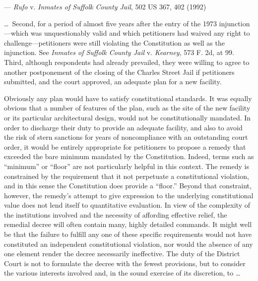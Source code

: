 \setupleglipsum
{ --- \textit{Rufo} v. \textit{Inmates of Suffolk County Jail}, 502 US 367, 402 (1992)}
{
\ldots\ 
Second, for a period of almost five
years after the entry of the 1973 injunction—which was unquestionably
valid and which petitioners had waived any
right to challenge—petitioners were still violating the Constitution
as well as the injunction. See \textit{Inmates of Suffolk
County Jail} v. \textit{Kearney}, 573 F. 2d, at 99. Third, although
respondents had already prevailed, they were willing to
agree to another postponement of the closing of the Charles
Street Jail if petitioners submitted, and the court approved,
an adequate plan for a new facility.\par
Obviously any plan would have to satisfy constitutional
standards. It was equally obvious that a number of features
of the plan, such as the site of the new facility or its particular
architectural design, would not be constitutionally mandated.
In order to discharge their duty to provide an adequate
facility, and also to avoid the risk of stern sanctions
for years of noncompliance with an outstanding court order,
it would be entirely appropriate for petitioners to propose a
remedy that exceeded the bare minimum mandated by the
Constitution. Indeed, terms such as “minimum” or “floor”
are not particularly helpful in this context. The remedy is
constrained by the requirement that it not perpetuate a constitutional
violation, and in this sense the Constitution does
provide a “floor.” Beyond that constraint, however, the
remedy’s attempt to give expression to the underlying constitutional
value does not lend itself to quantitative evaluation.
In view of the complexity of the institutions involved
and the necessity of affording effective relief, the remedial
decree will often contain many, highly detailed commands.
It might well be that the failure to fulfill any one of these
specific requirements would not have constituted an independent
constitutional violation, nor would the absence of
any one element render the decree necessarily ineffective.
The duty of the District Court is not to formulate the decree
with the fewest provisions, but to consider the various interests
involved and, in the sound exercise of its discretion, to \ldots\par
}

